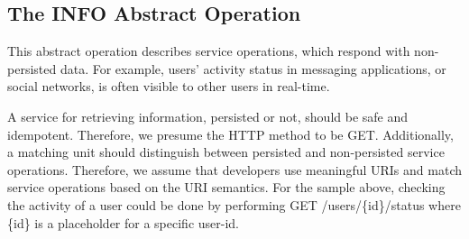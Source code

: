\subsection{The INFO Abstract Operation}
This abstract operation describes service operations, which respond with non-persisted data. For example, users' activity status in messaging applications, or social networks, is often visible to other users in real-time. 

A service for retrieving information, persisted or not, should be safe and idempotent. Therefore, we presume the HTTP method to be GET. Additionally, a matching unit should distinguish between persisted and non-persisted service operations. Therefore, we assume that developers use meaningful URIs and match service operations based on the URI semantics. For the sample above, checking the activity of a user could be done by performing GET /users/\{id\}/status where \{id\} is a placeholder for a specific user-id.